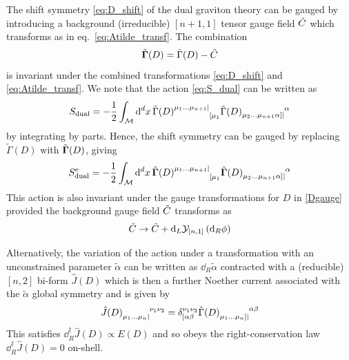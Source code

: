 The shift symmetry \eqref{eq:D_shift} of the dual graviton theory can be gauged by introducing a background (irreducible) $[n+1,1]$ tensor gauge field $\tilde{C}$ which transforms as in eq.~\eqref{eq:Atilde_transf}.
The combination 
\begin{equation}
    \tilde{\mathbf{\Gamma}}(D) = \tilde{\Gamma}(D) - \tilde{C}
\end{equation}
is invariant under the combined transformations \eqref{eq:D_shift} and \eqref{eq:Atilde_transf}. We note that the action \eqref{eq:S_dual} can be written as
\begin{equation}\label{eq:S_dual_rewrite_tilde}
    S_{\text{dual}} = -\frac{1}{2} \int_{\mathcal{M}} \dd[d]{x} \tilde{\Gamma}(D)\indices{^{\mu_1\dots\mu_{n+1}|}_{[\mu_1}} \tilde{\Gamma}(D)\indices{_{\mu_2\dots\mu_{n+1}\alpha]|}^\alpha}
\end{equation}
by integrating by parts. Hence, the shift symmetry can be gauged by replacing $\tilde{\Gamma}(D)$ with $\tilde{\mathbf{\Gamma}}(D)$, giving
\begin{equation}
    S^{\text{e}}_{\text{dual}} = -\frac{1}{2} \int_{\mathcal{M}} \dd[d]{x} \tilde{\ggamma}(D)\indices{^{\mu_1\dots\mu_{n+1}|}_{[\mu_1}} \tilde{\ggamma}(D)\indices{_{\mu_2\dots\mu_{n+1}\alpha]|}^\alpha}
\end{equation}
This action is also invariant under the gauge transformations for $D$ in \eqref{Dgauge} provided the background gauge field $\tilde{C}$ transforms as 
\begin{equation}\label{Ctgauge}
    \tilde{C}\to \tilde{C} + \dd_L  \mathcal{Y}_{[n,1]} \left(\dd_R \phi\right)
\end{equation}

Alternatively, the variation of the action under a transformation with an unconstrained parameter $\tilde{\alpha}$ can be written as $\dd_R\tilde{\alpha}$ contracted with a (reducible) $[n,2]$ bi-form $\hat{J}(D)$ which is then a further Noether current associated with the $\tilde{\alpha}$ global symmetry and is given by 
\begin{equation}\label{eq:Jhat}
    \hat{J}(D)\indices{_{\mu_1\dots\mu_n|}^{\nu_1\nu_2}} = \delta^{\nu_1\nu_2}_{[\alpha\beta} \hat{\Gamma}(D)\indices{_{\mu_1\dots\mu_n]|}^{\alpha\beta}}
\end{equation}
This satisfies $\dd_R^\dag \hat{J}(D) \propto E(D)$ and so 
obeys the right-conservation law $\dd_R^\dag \hat{J}(D)=0$ on-shell.

